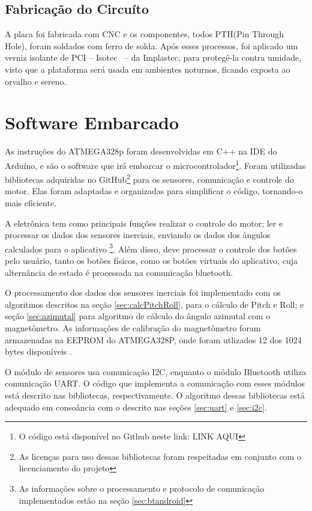 \subsection{Fabricação do Circuíto}
A placa foi fabricada com CNC e os componentes, todos PTH(Pin Through Hole), foram soldados com ferro de solda. Após esses processos, foi aplicado um verniz isolante de PCI -- Isotec \textregistered ~-- da Implastec, para protegê-la contra umidade, visto que a plataforma será usada em ambientes noturnos, ficando exposta ao orvalho e sereno.

\section{Software Embarcado}

As instruções do ATMEGA328p foram desenvolvidas em C++ na IDE do Arduíno, e são o software que irá embarcar o microcontrolador\footnote{O código está disponível no Github neste link: LINK AQUI}. Foram utilizadas bibliotecas adquiridas no GitHub\footnote{As licenças para uso dessas bibliotecas foram respeitadas em conjunto com o licenciamento do projeto} para os sensores, comunicação e controle do motor. Elas foram adaptadas e organizadas para simplificar o código, tornando-o mais eficiente. 

A eletrônica tem como principais funções realizar o controle do motor; ler e processar os dados dos sensores inerciais, enviando os dados dos ângulos calculados para o aplicativo \footnote{As informações sobre o processamento e protocolo de comunicação implementados estão na seção \ref{sec:btandroid}}. Além disso, deve processar o controle dos botões pelo usuário, tanto os botões físicos, como os botões virtuais do aplicativo, cuja alternância de estado é processada na comunicação bluetooth. 

O processamento dos dados dos sensores inerciais foi implementado com os algoritmos descritos na seção \ref{sec:calcPitchRoll}, para o cálculo de Pitch e Roll; e seção \ref{sec:azimutal} para algoritmo de cálculo do ângulo azimutal com o magnetômetro. As informações de calibração do magnetômetro foram armazenadas na EEPROM do ATMEGA328P, onde foram utlizados 12 dos 1024 bytes disponíveis \cite{man:atmegadatasheet}.

O módulo de sensores usa comunicação I2C, enquanto o módulo Bluetooth utiliza comunicação UART. O código que implementa a comunicação com esses módulos está descrito nas bibliotecas, respectivamente. O algoritmo dessas bibliotecas está adequado em consoância com o descrito nas seções \ref{sec:uart} e \ref{sec:i2c}.
